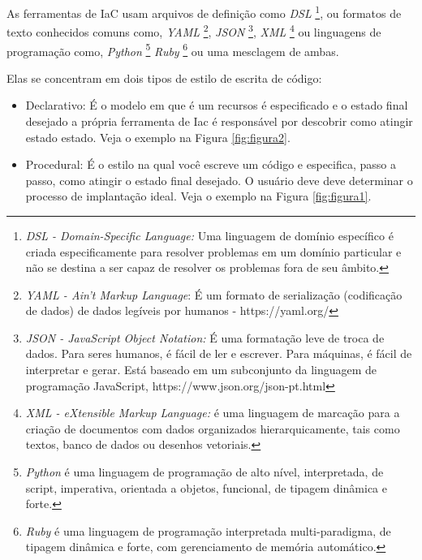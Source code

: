 As ferramentas de IaC usam arquivos de definição como \textit{DSL} \footnote{\textit{DSL - Domain-Specific Language:} Uma linguagem de domínio específico é criada especificamente para resolver problemas em um domínio particular e não se destina a ser capaz de resolver os problemas fora de seu âmbito. }, ou formatos de texto conhecidos comuns como, \textit{ YAML} \footnote{\textit{YAML - Ain't  Markup Language}: É um formato de serialização (codificação de dados) de dados legíveis por humanos -  https://yaml.org/ }, \textit{JSON} \footnote{\textit{JSON - JavaScript Object Notation:} É uma formatação leve de troca de dados. Para seres humanos, é fácil de ler e escrever. Para máquinas, é fácil de interpretar e gerar. Está baseado em um subconjunto da linguagem de programação JavaScript, https://www.json.org/json-pt.html}, \textit{XML} \footnote{\textit{XML - eXtensible Markup Language:} é uma linguagem de marcação para a criação de documentos com dados organizados hierarquicamente, tais como textos, banco de dados ou desenhos vetoriais.}
  ou linguagens de programação como, \textit{Python} \footnote{\textit{Python} é uma linguagem de programação de alto nível, interpretada, de script, imperativa, orientada a objetos, funcional, de tipagem dinâmica e forte.}  \textit{Ruby} \footnote{\textit{Ruby} é uma linguagem de programação interpretada multi-paradigma, de tipagem dinâmica e forte, com gerenciamento de memória automático.}  ou uma mesclagem de ambas.
  
  Elas se concentram em dois tipos de estilo de escrita de código: 
   \begin{itemize}
       \item Declarativo: É o modelo em que é um recursos é especificado e o estado final desejado a própria ferramenta de Iac é responsável por descobrir como atingir estado estado. Veja o exemplo na Figura \ref{fig:figura2}.
   \end{itemize}

 \begin{itemize}
    \item Procedural: É o estilo na qual você escreve um código e especifica, passo a passo, como atingir o estado final desejado. O usuário deve deve determinar o processo de implantação ideal. Veja o exemplo na Figura \ref{fig:figura1}.
   \end{itemize}
   
